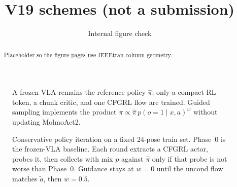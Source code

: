 \documentclass[letterpaper,10pt,conference]{IEEEtran}
\title{V19 schemes (not a submission)}
\author{Internal figure check}
\begin{document}
\maketitle

\begin{abstract}
Placeholder so the figure pages use IEEEtran column geometry.
\end{abstract}

\begin{figure}[!t]
\centering
\resizebox{\textwidth}{!}{}
\caption{A frozen VLA remains the reference policy $\hat\pi$; only a compact
RL token, a chunk critic, and one CFGRL flow are trained. Guided sampling
implements the product $\pi\propto\hat\pi\,p(o{=}1\mid x,a)^{w}$ without
updating MolmoAct2.}
\label{fig:v19-arch}
\end{figure}

\begin{figure}[!t]
\centering
\resizebox{\textwidth}{!}{}
\caption{Conservative policy iteration on a fixed 24-pose train set.
Phase~0 is the frozen-VLA baseline. Each round extracts a CFGRL actor,
probes it, then collects with mix $p$ against $\hat\pi$ only if that probe
is not worse than Phase~0. Guidance stays at $w=0$ until the uncond flow
matches $\tilde{a}$, then $w=0.5$.}
\label{fig:v19-loop}
\end{figure}
\end{document}
